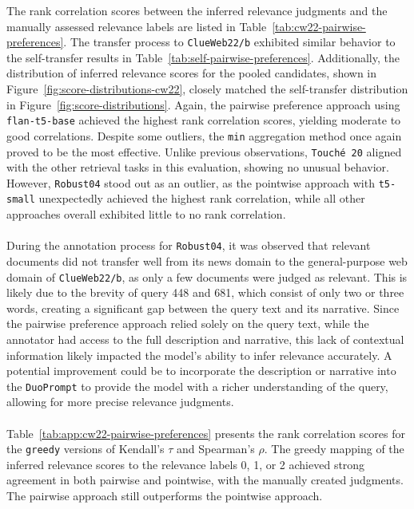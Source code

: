 The rank correlation scores between the inferred relevance judgments and the manually assessed relevance labels are listed in Table~\ref{tab:cw22-pairwise-preferences}. The transfer process to \texttt{ClueWeb22/b} exhibited similar behavior to the self-transfer results in \mbox{Table~\ref{tab:self-pairwise-preferences}}. Additionally, the distribution of inferred relevance scores for the pooled candidates, shown in Figure~\ref{fig:score-distributions-cw22}, closely matched the self-transfer distribution in Figure~\ref{fig:score-distributions}. Again, the pairwise preference approach using \texttt{flan-t5-base} achieved the highest rank correlation scores, yielding moderate to good correlations. Despite some outliers, the \texttt{min} aggregation method once again proved to be the most effective. Unlike previous observations, \mbox{\texttt{Touché 20}} aligned with the other retrieval tasks in this evaluation, showing no unusual behavior. However, \texttt{Robust04} stood out as an outlier, as the pointwise approach with \texttt{t5-small} unexpectedly achieved the highest rank correlation, while all other approaches overall exhibited little to no rank correlation.
\\\\
During the annotation process for \texttt{Robust04}, it was observed that relevant documents did not transfer well from its news domain to the general-purpose web domain of \texttt{ClueWeb22/b}, as only a few documents were judged as relevant. This is likely due to the brevity of query 448 and 681, which consist of only two or three words, creating a significant gap between the query text and its narrative. Since the pairwise preference approach relied solely on the query text, while the annotator had access to the full description and narrative, this lack of contextual information likely impacted the model's ability to infer relevance accurately. A potential improvement could be to incorporate the description or narrative into the \texttt{DuoPrompt} to provide the model with a richer understanding of the query, allowing for more precise relevance \mbox{judgments}.
\\\\
Table~\ref{tab:app:cw22-pairwise-preferences} presents the rank correlation scores for the \texttt{greedy} versions of Kendall's $\tau$ and Spearman's $\rho$. The greedy mapping of the inferred relevance scores to the relevance labels 0, 1, or 2 achieved strong agreement in both pairwise and pointwise, with the manually created judgments. The pairwise approach still outperforms the pointwise approach.

